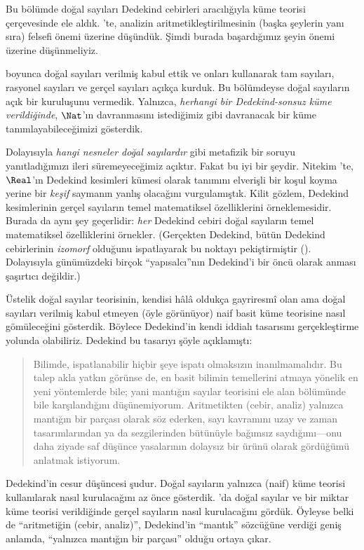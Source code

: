 \documentclass[../../../include/open-logic-section]{subfiles}
\begin{document}


Bu bölümde doğal sayıları Dedekind cebirleri aracılığıyla küme teorisi
çerçevesinde ele aldık. 'te, analizin
aritmetikleştirilmesinin (başka şeylerin yanı sıra) felsefi önemi üzerine
düşündük. Şimdi burada başardığımız şeyin önemi üzerine düşünmeliyiz.

 boyunca doğal sayıları verilmiş kabul ettik ve
onları kullanarak tam sayıları, rasyonel sayıları ve gerçel sayıları açıkça
kurduk. Bu bölümdeyse doğal sayıların açık bir kuruluşunu vermedik. Yalnızca,
\emph{herhangi bir Dedekind-sonsuz küme verildiğinde}, $\Nat$'ın davranmasını
istediğimiz gibi davranacak bir küme tanımlayabileceğimizi gösterdik.

Dolayısıyla \emph{hangi nesneler doğal sayılardır} gibi metafizik bir soruyu
yanıtladığımızı ileri süremeyeceğimiz açıktır. Fakat bu iyi bir şeydir.
Nitekim 'te, $\Real$'ın Dedekind kesimleri kümesi
olarak tanımını elverişli bir koşul koyma yerine bir \emph{keşif} saymanın
yanlış olacağını vurgulamıştık. Kilit gözlem, Dedekind kesimlerinin gerçel
sayıların temel matematiksel özelliklerini örneklemesidir. Burada da aynı şey
geçerlidir: \emph{her} Dedekind cebiri doğal sayıların temel matematiksel
özelliklerini örnekler. (Gerçekten Dedekind, bütün Dedekind cebirlerinin
\emph{izomorf} olduğunu ispatlayarak bu noktayı pekiştirmiştir
(\citeyear[Theorems 132--3]{Dedekind1888}). Dolayısıyla günümüzdeki birçok
``yapısalcı''nın Dedekind'i bir öncü olarak anması şaşırtıcı değildir.)

Üstelik doğal sayılar teorisinin, kendisi hâlâ oldukça gayriresmî olan ama
doğal sayıları verilmiş kabul etmeyen (öyle görünüyor) naif basit küme
teorisine nasıl gömüleceğini gösterdik. Böylece Dedekind'in kendi iddialı
tasarısını gerçekleştirme yolunda olabiliriz. Dedekind bu tasarıyı şöyle
açıklamıştı:
\begin{quote}
	Bilimde, ispatlanabilir hiçbir şeye ispatı olmaksızın inanılmamalıdır.
	Bu talep akla yatkın görünse de, en basit bilimin temellerini atmaya
	yönelik en yeni yöntemlerde bile; yani mantığın sayılar teorisini ele
	alan bölümünde bile karşılandığını düşünemiyorum. Aritmetikten (cebir,
	analiz) yalnızca mantığın bir parçası olarak söz ederken, sayı kavramını
	uzay ve zaman tasarımlarından ya da sezgilerinden bütünüyle bağımsız
	saydığımı---onu daha ziyade saf düşünce yasalarının dolaysız bir ürünü
	olarak gördüğümü anlatmak istiyorum.
	\citep[preface]{Dedekind1888}
\end{quote}
Dedekind'in cesur düşüncesi şudur. Doğal sayıların yalnızca (naif) küme
teorisi kullanılarak nasıl kurulacağını az önce gösterdik.
'da doğal sayılar ve bir miktar küme teorisi
verildiğinde gerçel sayıların nasıl kurulacağını gördük. Öyleyse belki de
``aritmetiğin (cebir, analiz)'', Dedekind'in ``mantık'' sözcüğüne verdiği
geniş anlamda, ``yalnızca mantığın bir parçası'' olduğu ortaya çıkar.
\end{document}

